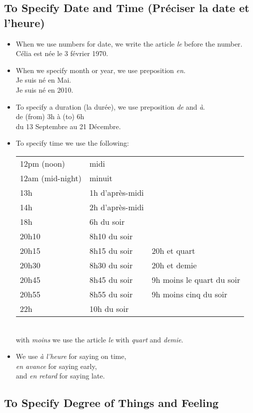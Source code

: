 \subsection{To Specify Date and Time (Pr\'eciser la date et l'heure)}

\begin{itemize}
\item When we use numbers for date, we write the article \emph{le} before the number.\\
C\'elia est n\'ee le 3 f\'evrier 1970.
\item When we specify month or year, we use preposition \emph{en}.\\
Je suis n\'e en Mai.\\
Je suis n\'e en 2010.
\item To specify a duration (la dur\'ee), we use preposition \emph{de} and \emph{\`a}.\\
de (from) 3h \`a (to) 6h\\
du 13 Septembre au 21 D\'ecembre.
\item To specify time we use the following:\\
\begin{tabular}{l l l}
12pm (noon) & midi\\
12am (mid-night) & minuit\\
13h & 1h d'apr\`es-midi\\
14h & 2h d'apr\`es-midi\\
18h & 6h du soir  \\
20h10 & 8h10 du soir\\
20h15 & 8h15 du soir & 20h et quart \\
20h30 & 8h30 du soir & 20h et demie \\
20h45 & 8h45 du soir & 9h moins le quart du soir \\
20h55 & 8h55 du soir & 9h moins cinq du soir \\
22h & 10h du soir \\
\end{tabular}\\
with \emph{moins} we use the article \emph{le} with \emph{quart} and \emph{demie}.
\item We use \emph{\`a l'heure} for saying on time,\\
\emph{en avance} for saying early,\\
and \emph{en retard} for saying late.
\end{itemize}

\subsection{To Specify Degree of Things and Feeling}

